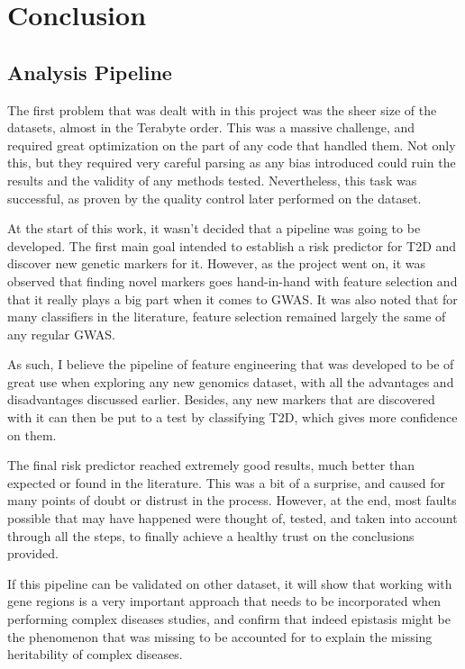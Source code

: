 
\chapter{Conclusion} \label{chapter:conclusions}

\section{Analysis Pipeline}

The first problem that was dealt with in this project was the sheer size of the datasets, almost in the Terabyte order. This was a massive challenge, and required great optimization on the part of any code that handled them. Not only this, but they required very careful parsing as any bias introduced could ruin the results and the validity of any methods tested. Nevertheless, this task was successful, as proven by the quality control later performed on the dataset.

At the start of this work, it wasn't decided that a pipeline was going to be developed. The first main goal intended to establish a risk predictor for \gls{T2D} and discover new genetic markers for it. However, as the project went on, it was observed that finding novel markers goes hand-in-hand with feature selection and that it really plays a big part when it comes to \gls{GWAS}. It was also noted that for many classifiers in the literature, feature selection remained largely the same of any regular \gls{GWAS}.

As such, I believe the pipeline of feature engineering that was developed to be of great use when exploring any new genomics dataset, with all the advantages and disadvantages discussed earlier. Besides, any new markers that are discovered with it can then be put to a test by classifying \gls{T2D}, which gives more confidence on them. 

The final risk predictor reached extremely good results, much better than expected or found in the literature. This was a bit of a surprise, and caused for many points of doubt or distrust in the process. However, at the end, most faults possible that may have happened were thought of, tested, and taken into account through all the steps, to finally achieve a healthy trust on the conclusions provided.

If this pipeline can be validated on other dataset, it will show that working with gene regions is a very important approach that needs to be incorporated when performing complex diseases studies, and confirm that indeed epistasis might be the phenomenon that was missing to be accounted for to explain the missing heritability of complex diseases.

